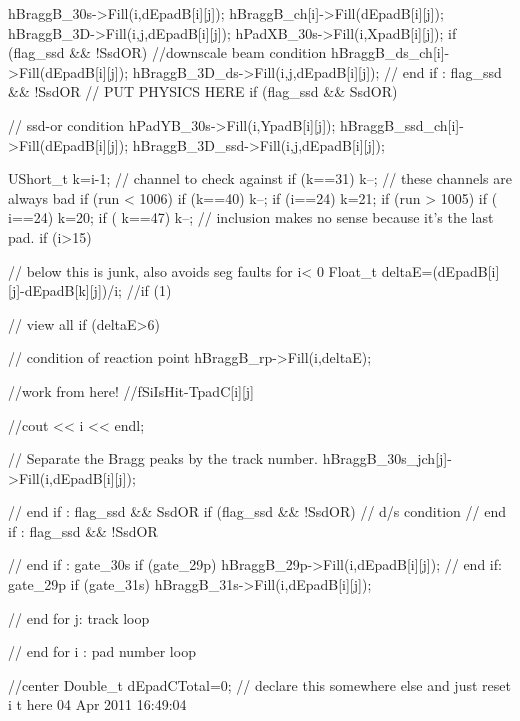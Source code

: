 \begin{DoxyCode}
{{{{{{{{{{{{{               hBraggB_30s->Fill(i,dEpadB[i][j]);
               hBraggB_ch[i]->Fill(dEpadB[i][j]);
               hBraggB_3D->Fill(i,j,dEpadB[i][j]);
               hPadXB_30s->Fill(i,XpadB[i][j]);
               if (flag_ssd && !SsdOR) { //downscale beam condition
                 hBraggB_ds_ch[i]->Fill(dEpadB[i][j]);
                 hBraggB_3D_ds->Fill(i,j,dEpadB[i][j]);
               } // end if : flag_ssd && !SsdOR
               // PUT PHYSICS HERE
               if (flag_ssd && SsdOR) { // ssd-or condition
                 hPadYB_30s->Fill(i,YpadB[i][j]);
                 hBraggB_ssd_ch[i]->Fill(dEpadB[i][j]);
                 hBraggB_3D_ssd->Fill(i,j,dEpadB[i][j]);
                 
                 UShort_t k=i-1; // channel to check against
                 if (k==31) k--; // these channels are always bad
                 if (run < 1006){
                   if (k==40) k--;
                 if (i==24) k=21;
                 }
                 if (run > 1005) { 
                   if ( i==24) k=20;
                   if ( k==47) k--; // inclusion makes no sense because it's the 
      last pad.
                 }
                 if (i>15) { // below this is junk, also avoids seg faults for i<
      0
                   Float_t deltaE=(dEpadB[i][j]-dEpadB[k][j])/i; 
                   //if (1) { // view all
                   if (deltaE>6) { // condition of reaction point
                     hBraggB_rp->Fill(i,deltaE);
                     
                   //work from here!
                   //fSiIsHit-TpadC[i][j]
                   
                   //cout << i << endl;
                   }
                 }
                 // Separate the Bragg peaks by the track number. 
                 hBraggB_30s_jch[j]->Fill(i,dEpadB[i][j]);
               } // end if : flag_ssd && SsdOR
               if (flag_ssd && !SsdOR) { // d/s condition
               } // end if : flag_ssd && !SsdOR
             } // end if : gate_30s
             if (gate_29p) {
               hBraggB_29p->Fill(i,dEpadB[i][j]);
             } // end if: gate_29p
             if (gate_31s) hBraggB_31s->Fill(i,dEpadB[i][j]);
            } // end for j: track loop
          } // end for i : pad number loop
          
          //center
          Double_t dEpadCTotal=0; // declare this somewhere else and just reset i
      t here 04 Apr 2011 16:49:04 
          
}}}}}}}}}}}
\end{DoxyCode}
